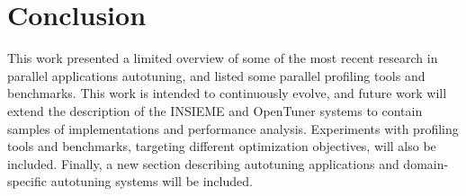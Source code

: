 \documentclass[a4paper, 12pt]{article}
\begin{document}
\section{Conclusion} \label{sec:conclusion}

This work presented a limited overview of some of the most recent research in
parallel applications autotuning, and listed some parallel profiling tools
and benchmarks. This work is intended to continuously evolve, and future
work will extend the description of the INSIEME and OpenTuner systems to
contain samples of implementations and performance analysis. Experiments
with profiling tools and benchmarks, targeting different optimization
objectives, will also be included. Finally, a new section describing autotuning
applications and domain-specific autotuning systems will be included.

\newpage
 

\end{document}
